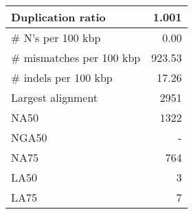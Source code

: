 \documentclass[12pt,a4paper]{article}
\begin{document}
\begin{table}[ht]
\begin{center}
\begin{tabular}{|l*{1}{|r}|}
Duplication ratio & 1.001 \\ \hline
\# N's per 100 kbp & 0.00 \\ \hline
\# mismatches per 100 kbp & 923.53 \\ \hline
\# indels per 100 kbp & 17.26 \\ \hline
Largest alignment & 2951 \\ \hline
NA50 & 1322 \\ \hline
NGA50 & - \\ \hline
NA75 & 764 \\ \hline
LA50 & 3 \\ \hline
LA75 & 7 \\ \hline
\end{tabular}
\end{center}
\end{table}
\end{document}
